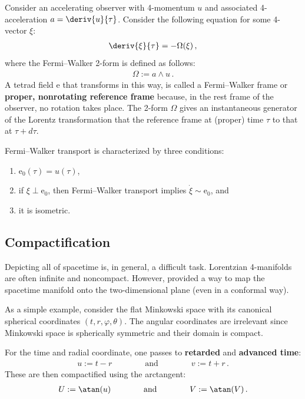     \begin{definition}
        Consider an accelerating observer with 4-momentum $u$ and associated 4-acceleration $a=\deriv{u}{\tau}$. Consider the following equation for some 4-vector $\xi$:
        \begin{gather}
            \deriv{\xi}{\tau} = -\Omega(\xi)\,,
        \end{gather}
        where the Fermi--Walker 2-form is defined as follows:
        \begin{gather}
            \Omega := a\wedge u\,.
        \end{gather}
        A tetrad field $\mathrm{e}$ that transforms in this way, is called a Fermi--Walker frame or \textbf{proper, nonrotating reference frame} because, in the rest frame of the observer, no rotation takes place. The 2-form $\Omega$ gives an instantaneous generator of the Lorentz transformation that the reference frame at (proper) time $\tau$ to that at $\tau+d\tau$.

        Fermi--Walker transport is characterized by three conditions:
        \begin{enumerate}
            \item $\mathrm{e}_0(\tau)=u(\tau)$,
            \item if $\xi\perp\mathrm{e}_0$, then Fermi--Walker transport implies $\dot{\xi}\sim\mathrm{e}_0$, and
            \item it is isometric.
        \end{enumerate}
    \end{definition}

\subsection{Compactification}

    Depicting all of spacetime is, in general, a difficult task. Lorentzian 4-manifolds are often infinite and noncompact. However,  provided a way to map the spacetime manifold onto the two-dimensional plane (even in a conformal way).

    \begin{example}
        As a simple example, consider the flat Minkowski space with its canonical spherical coordinates $(t,r,\varphi,\theta)$. The angular coordinates are irrelevant since Minkowski space is spherically symmetric and their domain is compact.

        For the time and radial coordinate, one passes to \textbf{retarded} and \textbf{advanced time}:
        \begin{gather}
            u := t-r \qquad\qquad\text{and}\qquad\qquad v:=t+r\,.
        \end{gather}
        These are then compactified using the arctangent:
        \begin{gather}
            U := \atan(u) \qquad\qquad\text{and}\qquad\qquad V:=\atan(V)\,.
        \end{gather}
    \end{example}

